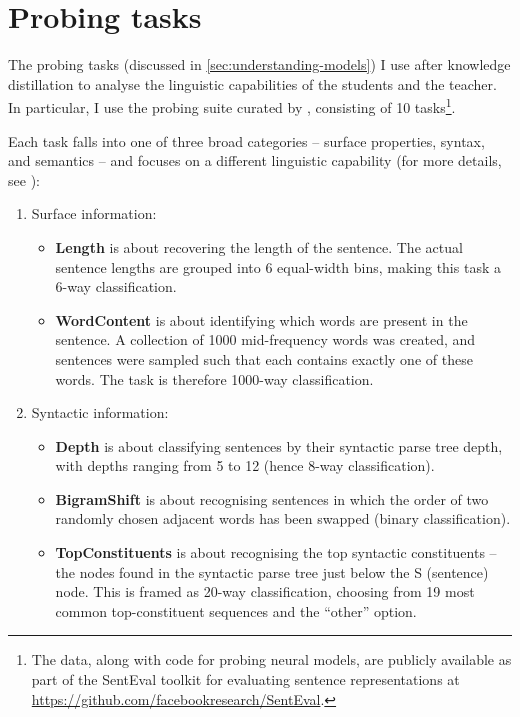 \documentclass[bsc,frontabs,twoside,singlespacing,parskip,deptreport]{infthesis}
\begin{document}
{  \section{Probing tasks}{
    The probing tasks (discussed in \autoref{sec:understanding-models}) I use after knowledge distillation to analyse the linguistic capabilities of the students and the teacher. In particular, I use the probing suite curated by \citet{Conneau_2018}, consisting of 10 tasks\footnote{The data, along with code for probing neural models, are publicly available as part of the SentEval toolkit for evaluating sentence representations \citep{SentEval-paper} at \url{https://github.com/facebookresearch/SentEval}.}.

    Each task falls into one of three broad categories -- surface properties, syntax, and semantics -- and focuses on a different linguistic capability (for more details, see \citet{Conneau_2018}):
    \begin{enumerate}
      \item {Surface information:
        \begin{itemize}
          \item \textbf{Length} is about recovering the length of the sentence. The actual sentence lengths are grouped into 6 equal-width bins, making this task a 6-way classification.
          \item \textbf{WordContent} is about identifying which words are present in the sentence. A collection of 1000 mid-frequency words was created, and sentences were sampled such that each contains exactly one of these words. The task is therefore 1000-way classification.
        \end{itemize}
      }
      \item{Syntactic information:
        \begin{itemize}
          \item \textbf{Depth} is about classifying sentences by their syntactic parse tree depth, with depths ranging from 5 to 12 (hence 8-way classification).
          \item \textbf{BigramShift} is about recognising sentences in which the order of two randomly chosen adjacent words has been swapped (binary classification).
          \item \textbf{TopConstituents} is about recognising the top syntactic constituents -- the nodes found in the syntactic parse tree just below the S (sentence) node. This is framed as 20-way classification, choosing from 19 most common top-constituent sequences and the ``other'' option.

\end{itemize}}
\end{enumerate}}}
\end{document}

